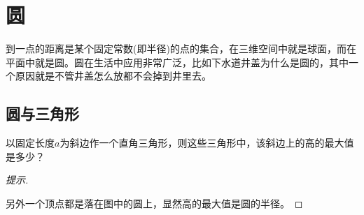 
\chapter{圆}
\label{chap:circle}

到一点的距离是某个固定常数(即半径)的点的集合，在三维空间中就是球面，而在平面中就是圆。圆在生活中应用非常广泛，比如下水道井盖为什么是圆的，其中一个原因就是不管井盖怎么放都不会掉到井里去。

\section{圆与三角形}
\label{sec:circle-and-triangle}

\begin{example}
  以固定长度$a$为斜边作一个直角三角形，则这些三角形中，该斜边上的高的最大值是多少？
\end{example}
\begin{proof}[提示]\mbox{}\par
  \begin{center}
  \end{center}
  另外一个顶点都是落在图中的圆上，显然高的最大值是圆的半径。
\end{proof}

